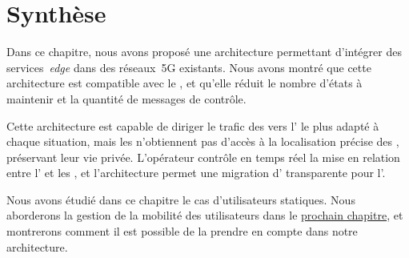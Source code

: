 \documentclass[../main.tex]{subfiles}
\begin{document}
\section{Synthèse}
Dans ce chapitre, nous avons proposé une architecture permettant d’intégrer des services~\textit{edge} dans des réseaux~5G existants.
Nous avons montré que cette architecture est compatible avec le , et qu’elle réduit le nombre d’états à maintenir et la quantité de messages de contrôle.

Cette architecture est capable de diriger le trafic des  vers l’ le plus adapté à chaque situation, mais les  n’obtiennent pas d’accès à la localisation précise des , préservant leur vie privée.
L’opérateur contrôle en temps réel la mise en relation entre l’ et les , et l’architecture permet une migration d’ transparente pour l’.

Nous avons étudié dans ce chapitre le cas d’utilisateurs statiques.
Nous aborderons la gestion de la mobilité des utilisateurs dans le \hyperref[ch:mobility]{prochain chapitre}, et montrerons comment il est possible de la prendre en compte dans notre architecture.
\end{document}
